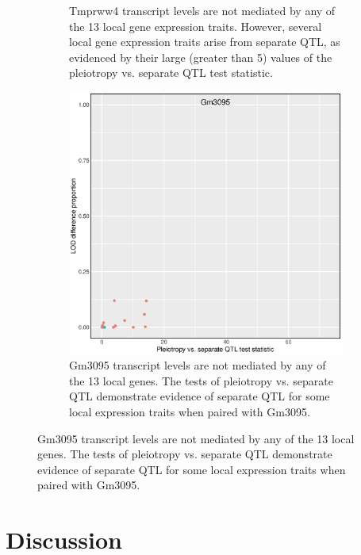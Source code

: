 \documentclass{article}
\begin{document}
\begin{figure}
\begin{subfigure}[t]{.45\textwidth}
        \caption{Tmprww4 transcript levels are not mediated by any of the 13 local gene expression traits. However, several local gene expression traits arise from separate QTL, as evidenced by their large (greater than 5) values of the pleiotropy vs. separate QTL test statistic.}
    \end{subfigure}
    \begin{subfigure}[t]{.45\textwidth}
        \includegraphics[width = \textwidth]{../Rmd/nonlocal-scatter_141.eps}
        \caption{Gm3095 transcript levels are not mediated by any of the 13 local genes. The tests of pleiotropy vs. separate QTL demonstrate evidence of separate QTL for some local expression traits when paired with Gm3095.}
    \end{subfigure}
    \label{fig:4nonlocal}
\end{figure}





\section{Discussion}
\end{document}
